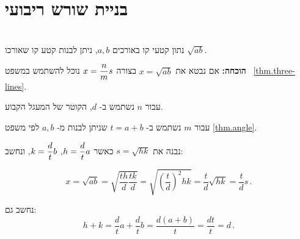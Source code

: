 
\section{%
בניית שורש ריבועי%
}\label{s.root}

\begin{theorem}\label{thm.root}\mbox{}\\
נתון קטעי קו באורכים
$a,b$,
ניתן לבנות קטע קו שאורכו
$\sqrt{ab}$.
\end{theorem}

\textbf{הוכחה:}
אם נבטא את
$x=\sqrt{ab}$
בצורה
$x=\displaystyle\frac{n}{m}s$
נוכל להשתמש במשפט~%
\ref{thm.three-lines}.

עבור
$n$
נשתמש ב-%
$d$,
הקוטר של המעגל הקבוע.

עבור
$m$
נשתמש ב-%
$t=a+b$
שניתן לבנות מ-%
$a,b$
לפי משפט
\ref{thm.angle}.

נבנה את
$s=\sqrt{hk}$
כאשר
$h=\displaystyle\frac{d}{t}a$, $k=\displaystyle\frac{d}{t}b$,
ונחשב:

\[
x=\sqrt{ab}=\sqrt{\frac{th}{d}\frac{tk}{d}}=\sqrt{\left(\frac{t}{d}\right)^2hk}=\frac{t}{d}\sqrt{hk}=\frac{t}{d}s\,.
\]

נחשב גם: 
\[
h+k = \frac{d}{t}a + \frac{d}{t}b = \frac{d(a+b)}{t} = \frac{dt}{t} = d\,.
\]


